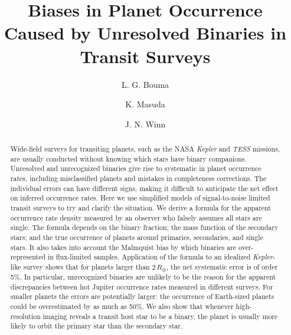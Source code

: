 \documentclass[12pt,modern,trackchanges]{aastex61}
\begin{document}
    
\title{ Biases in Planet Occurrence Caused by Unresolved Binaries in
        Transit Surveys }
%
%
\author[0000-0002-0514-5538]{L. G. Bouma}
\author[0000-0003-1298-9699]{K. Masuda}
\author[0000-0002-4265-047X]{J. N. Winn}
%
%
\begin{abstract}
%
Wide-field surveys for transiting planets, such as the NASA {\it
Kepler} and {\it TESS} missions, are usually conducted without
knowing which stars have binary companions. Unresolved and
unrecognized binaries give rise to systematic 
 in planet
occurrence rates, including misclassified planets and mistakes in
completeness corrections.  The individual errors can have different
signs, making it difficult to anticipate the net effect on inferred
occurrence rates. Here we use simplified models of signal-to-noise
limited transit surveys to try and clarify the situation. We derive a
formula for the apparent occurrence rate density measured by an
observer who falsely assumes all stars are single. The formula depends
on the binary fraction; the mass function of the secondary stars; and
the true occurrence of planets around primaries, secondaries, and
single stars. It also takes into account the Malmquist bias by which
binaries are over-represented in flux-limited samples. Application of
the formula to an idealized {\it Kepler}-like survey shows that for
planets larger than 2\,$R_\oplus$, the net systematic error is of
order 5\%.  In particular, unrecognized binaries are unlikely to be
the reason for the apparent discrepancies between hot Jupiter
occurrence rates measured in different surveys.  For smaller planets
the errors are potentially larger: the occurrence of Earth-sized
planets could be overestimated by as much as 50\%. We also show that
whenever high-resolution imaging reveals a transit host star to be a
binary, the planet is usually more likely to orbit the primary star
than the secondary star.
%
\end{abstract}
%
%
%
\end{document}
